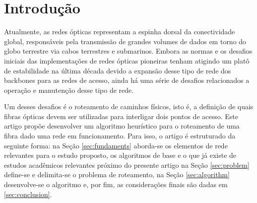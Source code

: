 \section{Introdução}

Atualmente, as redes ópticas representam a espinha dorsal da conectividade
global, responsáveis pela transmissão de grandes volumes de dados em torno do
globo terrestre via cabos terrestres e submarinos. Embora as normas e os desafios
iniciais das implementações de redes ópticas pioneiras tenham atigindo um platô
de estabilidade na última década devido a expansão desse tipo de rede dos
backbones para as redes de acesso, ainda há uma série de desafios relacionados
a operação e manutenção desse tipo de rede.

Um desses desafios é o roteamento de caminhos físicos, isto é, a definição de
quais fibras ópticas devem ser utilizadas para interligar dois pontos de
acesso. Este artigo propõe desenvolver um algoritmo heurístico para o
roteamento de uma fibra dado uma rede em funcionamento. Para isso, o artigo é
estruturado da seguinte forma: na Seção \ref{sec:fundaments} aborda-se os
elementos de rede relevantes para o estudo proposto, os algoritmos de base e o
que já existe de estudos acadêmicos relevantes próximo do presente artigo na
Seção \ref{sec:problem} define-se e delimita-se o problema de roteamento, na
Seção \ref{sec:algorithm} desenvolve-se o algoritmo e, por fim, as
considerações finais são dadas em \ref{sec:conclusion}.

